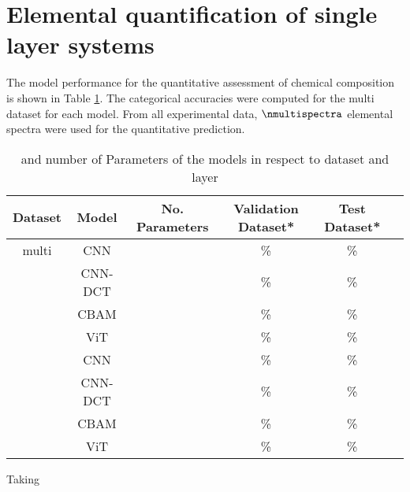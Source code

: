 \section{Elemental quantification of single layer systems}

The model performance for the quantitative assessment of chemical composition is shown in Table \ref{tab:acc_quant}. The categorical accuracies were computed for the multi dataset for each model.
From all experimental data, $\nmultispectra$ elemental spectra were used for the quantitative prediction. 

\begin{table}[H]
    \centering
    \begin{tabular}{c|c|c|c|c|c}
       Dataset & Model   & No. Parameters & Validation Dataset*  & Test Dataset*    \\
        \hline
        multi  & CNN     &                &        \%              &         \% \\
               & CNN-DCT &                &       \%              &          \% \\
               & CBAM    &                &       \%              &          \% \\
               & ViT     &                &       \%              &          \% \\
               & CNN     &                &       \%              &          \%  \\
               & CNN-DCT &                &       \%              &          \%  \\
               & CBAM    &                &       \%              &          \% \\
               & ViT     &                &       \%              &          \% \\
    \end{tabular}
    \caption{ and number of Parameters of the models in respect to dataset and layer}
    \label{tab:acc_quant}
\end{table}


Taking 
